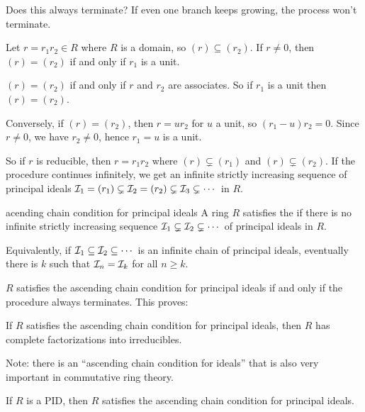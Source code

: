 \documentclass[12pt,letterpaper]{report}
\begin{document}
Does this always terminate?
If even one branch keeps growing, the process won't terminate.

\begin{lem}{}{}
  Let $r = r_1r_2 \in R$ where $R$ is a domain, so $(r) \subseteq (r_2)$.
  If $r \neq 0$, then $(r) = (r_2)$ if and only if $r_1$ is a unit.
\end{lem}

\begin{thmproof}
  $(r) = (r_2)$ if and only if $r$ and $r_2$ are associates.
  So if $r_1$ is a unit then $(r) = (r_2)$.

  Conversely, if $(r) = (r_2)$, then $r = ur_2$ for $u$ a unit, so $(r_1 - u)r_2 = 0$.
  Since $r \neq 0$, we have $r_2 \neq 0$, hence $r_1 = u$ is a unit.
\end{thmproof}

So if $r$ is reducible, then $r = r_1r_2$ where $(r) \subsetneq (r_1)$ and $(r) \subsetneq (r_2)$.
If the procedure continues infinitely, we get an infinite strictly increasing sequence of principal
ideals $\mathcal{I}_1 = (r_1) \subsetneq \mathcal{I}_2 = (r_2) \subsetneq \mathcal{I}_3 \subsetneq \cdots$ in $R$.

\begin{defn}{acending chain condition for principal ideals}{}
  A ring $R$ satisfies the  if there is no
  infinite strictly increasing sequence $\mathcal{I}_1 \subsetneq \mathcal{I}_2 \subsetneq \cdots$ of
  principal ideals in $R$.
\end{defn}

Equivalently, if $\mathcal{I}_1 \subseteq \mathcal{I}_2 \subseteq \cdots$ is an infinite chain of principal
ideals, eventually there is $k$ such that $\mathcal{I}_n = \mathcal{I}_k$ for all $n \geq k$.

$R$ satisfies the ascending chain condition for principal ideals if and only if the procedure
always terminates.
This proves:

\begin{prop}{}{}
  If $R$ satisfies the ascending chain condition for principal ideals, then $R$ has complete
  factorizations into irreducibles.
\end{prop}

Note: there is an ``ascending chain condition for ideals'' that is also very important in
commutative ring theory.

\begin{prop}{}{}
  If $R$ is a PID, then $R$ satisfies the ascending chain condition for principal ideals.
\end{prop}
\end{document}
